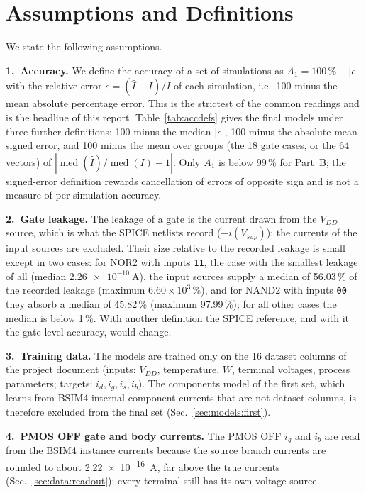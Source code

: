 \section{Assumptions and Definitions}\label{sec:assumptions}
We state the following assumptions.

\textbf{1.\ Accuracy.} We define the accuracy of a set of simulations as $A_1=100\,\%-\overline{|e|}$ with the relative error $e=(\hat I-I)/I$ of each simulation, i.e.\ 100 minus the mean absolute percentage error. This is the strictest of the common readings and is the headline of this report. Table~\ref{tab:accdefs} gives the final models under three further definitions: 100 minus the median $|e|$, 100 minus the absolute mean signed error, and 100 minus the mean over groups (the 18 gate cases, or the 64 vectors) of $|\operatorname{med}(\hat I)/\operatorname{med}(I)-1|$. Only $A_1$ is below 99\,\% for Part~B; the signed-error definition rewards cancellation of errors of opposite sign and is not a measure of per-simulation accuracy.
\begin{table}[t]
\caption{Final models under four accuracy definitions (\%).}
\label{tab:accdefs}
\centering\footnotesize
\setlength{\tabcolsep}{3pt}
\fitcol{}
\end{table}

\textbf{2.\ Gate leakage.} The leakage of a gate is the current drawn from the $V_{DD}$ source, which is what the SPICE netlists record ($-i(V_{sup})$); the currents of the input sources are excluded. Their size relative to the recorded leakage is small except in two cases: for NOR2 with inputs \texttt{11}, the case with the smallest leakage of all (median $\SI{2.26e-10}{\ampere}$), the input sources supply a median of 56.03\,\% of the recorded leakage (maximum $6.60\times10^{3}\,\%$), and for NAND2 with inputs \texttt{00} they absorb a median of 45.82\,\% (maximum 97.99\,\%); for all other cases the median is below 1\,\%. With another definition the SPICE reference, and with it the gate-level accuracy, would change.

\textbf{3.\ Training data.} The models are trained only on the 16 dataset columns of the project document (inputs: $V_{DD}$, temperature, $W$, terminal voltages, process parameters; targets: $i_d,i_g,i_s,i_b$). The components model of the first set, which learns from BSIM4 internal component currents that are not dataset columns, is therefore excluded from the final set (Sec.~\ref{sec:models:first}).

\textbf{4.\ PMOS OFF gate and body currents.} The PMOS OFF $i_g$ and $i_b$ are read from the BSIM4 instance currents because the source branch currents are rounded to about \SI{2.22e-16}{\ampere}, far above the true currents (Sec.~\ref{sec:data:readout}); every terminal still has its own voltage source.
